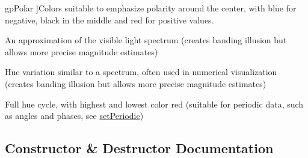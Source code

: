 \begin{Desc}
\begin{description}
{gp\+Polar\hypertarget{class_q_c_p_color_gradient_aed6569828fee337023670272910c9072ab7414ce4e36dc3e82e0132a7f0f41b52}{}\label{class_q_c_p_color_gradient_aed6569828fee337023670272910c9072ab7414ce4e36dc3e82e0132a7f0f41b52}
}]Colors suitable to emphasize polarity around the center, with blue for negative, black in the middle and red for positive values. \item[{\em 
gp\+Spectrum\hypertarget{class_q_c_p_color_gradient_aed6569828fee337023670272910c9072ad63adc100ef46f6b4a8a6deacec4642f}{}\label{class_q_c_p_color_gradient_aed6569828fee337023670272910c9072ad63adc100ef46f6b4a8a6deacec4642f}
}]An approximation of the visible light spectrum (creates banding illusion but allows more precise magnitude estimates) \item[{\em 
gp\+Jet\hypertarget{class_q_c_p_color_gradient_aed6569828fee337023670272910c9072a5f8a9e67b64c17ddfe4f069fe2b9fb02}{}\label{class_q_c_p_color_gradient_aed6569828fee337023670272910c9072a5f8a9e67b64c17ddfe4f069fe2b9fb02}
}]Hue variation similar to a spectrum, often used in numerical visualization (creates banding illusion but allows more precise magnitude estimates) \item[{\em 
gp\+Hues\hypertarget{class_q_c_p_color_gradient_aed6569828fee337023670272910c9072a30efe58407acfb67939032f70213a130}{}\label{class_q_c_p_color_gradient_aed6569828fee337023670272910c9072a30efe58407acfb67939032f70213a130}
}]Full hue cycle, with highest and lowest color red (suitable for periodic data, such as angles and phases, see \hyperlink{class_q_c_p_color_gradient_a39d6448155fc00a219f239220d14bb39}{set\+Periodic}) \end{description}
\end{Desc}


\subsection{Constructor \& Destructor Documentation}
